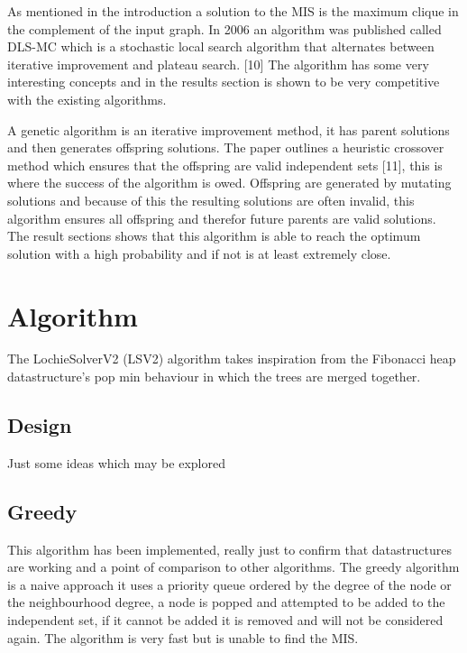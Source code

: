 \documentclass[conference]{IEEEtran}
\begin{document}
As mentioned in the introduction a solution to the MIS is the maximum clique in the complement of the input graph. In
2006 an algorithm was published called DLS-MC which is a stochastic local search algorithm that alternates between
iterative improvement and plateau search. [10] The algorithm has some very interesting concepts and in the results 
section is shown to be very competitive with the existing algorithms.

A genetic algorithm is an iterative improvement method, it has parent solutions and then generates offspring solutions.
The paper outlines a heuristic crossover method which ensures that the offspring are valid independent sets [11], this
is where the success of the algorithm is owed. Offspring are generated by mutating solutions and because of this the
resulting solutions are often invalid, this algorithm ensures all offspring and therefor future parents are valid 
solutions. The result sections shows that this algorithm is able to reach the optimum solution with a high probability
and if not is at least extremely close.


\section{Algorithm}

The LochieSolverV2 (LSV2) algorithm takes inspiration from the Fibonacci heap datastructure's pop min behaviour in which 
the trees are merged together.

\subsection{Design}

Just some ideas which may be explored

\subsection{Greedy}

This algorithm has been implemented, really just to confirm that datastructures are working and a point of comparison 
to other algorithms. The greedy algorithm is a naive approach it uses a priority queue ordered by the degree of the node 
or the neighbourhood degree, a node is popped and attempted to be added to the independent set, if it cannot be added it 
is removed and will not be considered again. The algorithm is very fast but is unable to find the MIS.

\end{document}
